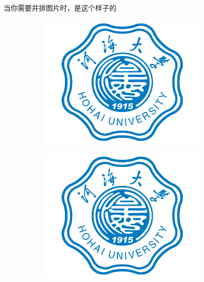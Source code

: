 当你需要并排图片时，是这个样子的
\begin{figure}[htbp]
    \centering
    \begin{subfigure}[b]{0.45\textwidth}
        \centering
        \includegraphics[width=0.9\textwidth]{figures/hohai_badge}
		\caption{}
		\label{Fig_second_1}
    \end{subfigure}
    \begin{subfigure}[b]{0.45\textwidth}
        \centering
        \includegraphics[width=0.9\textwidth]{figures/hohai_badge}
		\caption{}
		\label{Fig_second_2}
    \end{subfigure}
	\vspace{10pt}

    \label{Fig_second}
\end{figure}

